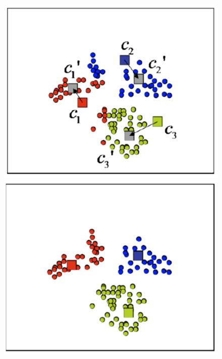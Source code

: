 \documentclass{article}
\begin{document}
\begin{figure}[H]
\includegraphics[scale=0.25]{Images/k-means-4.png}
\includegraphics[scale=0.25]{Images/k-means-5.png}
\end{figure}
\end{document}
